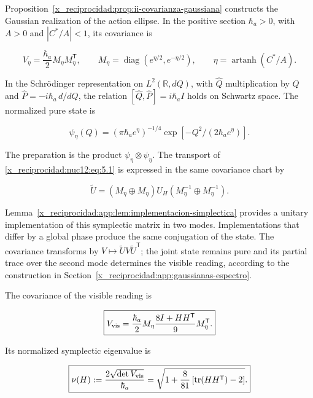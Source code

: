 Proposition~\ref{x_reciprocidad:prop:ii-covarianza-gaussiana} constructs the Gaussian realization of the action ellipse. In the positive section \(\hbar_a>0\), with \(A>0\) and \(|C^*/A|<1\), its covariance is



\begin{equation}
V_\eta=\frac{\hbar_a}{2}M_\eta M_\eta^{\mathsf T},\qquad
M_\eta=\operatorname{diag}(e^{\eta/2},e^{-\eta/2}),\qquad
\eta=\operatorname{artanh}(C^*/A).
\label{x_reciprocidad:nuc12:eq:5.4}
\end{equation}



In the Schrödinger representation on \(L^2(\mathbb R,dQ)\), with \(\widehat Q\) multiplication by \(Q\) and \(\widehat P=-i\hbar_a\,d/dQ\), the relation \([\widehat Q,\widehat P]=i\hbar_a I\) holds on Schwartz space. The normalized pure state is



\[
\psi_\eta(Q)=(\pi\hbar_a e^\eta)^{-1/4}
\exp[-Q^2/(2\hbar_a e^\eta)].
\]



The preparation is the product \(\psi_\eta\otimes\psi_\eta\). The transport of \eqref{x_reciprocidad:nuc12:eq:5.1} is expressed in the same covariance chart by



\begin{equation}
\widetilde U=(M_\eta\oplus M_\eta)U_H
(M_\eta^{-1}\oplus M_\eta^{-1}).
\label{x_reciprocidad:nuc12:eq:5.5}
\end{equation}



Lemma~\ref{x_reciprocidad:app:lem:implementacion-simplectica} provides a unitary implementation of this symplectic matrix in two modes. Implementations that differ by a global phase produce the same conjugation of the state. The covariance transforms by \(V\mapsto\widetilde U V\widetilde U^{\mathsf T}\); the joint state remains pure and its partial trace over the second mode determines the visible reading, according to the construction in Section~\ref{x_reciprocidad:app:gaussianas-espectro}.

\begin{theorem}

The covariance of the visible reading is



\begin{equation}
\boxed{V_{\rm vis}=
\frac{\hbar_a}{2}M_\eta
\frac{8I+HH^{\mathsf T}}9
M_\eta^{\mathsf T}.}
\label{x_reciprocidad:nuc12:eq:5.6}
\end{equation}



Its normalized symplectic eigenvalue is



\begin{equation}
\boxed{\nu(H):=\frac{2\sqrt{\det V_{\rm vis}}}{\hbar_a}
=\sqrt{1+\frac8{81}\left[\operatorname{tr}(HH^{\mathsf T})-2\right]}.}
\label{x_reciprocidad:nuc12:eq:5.7}
\end{equation}
\end{theorem}



